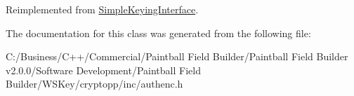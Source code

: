 Reimplemented from \hyperlink{class_simple_keying_interface_a97a47c942b6ce983d9ea6b58f22d5209}{SimpleKeyingInterface}.

The documentation for this class was generated from the following file:\begin{DoxyCompactItemize}
\item 
C:/Business/C++/Commercial/Paintball Field Builder/Paintball Field Builder v2.0.0/Software Development/Paintball Field Builder/WSKey/cryptopp/inc/authenc.h\end{DoxyCompactItemize}
